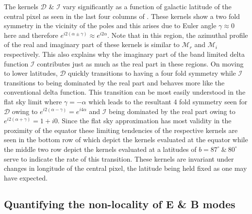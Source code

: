 The kernels $\mathcal{D}$ \& $\mathcal{I}$ vary significantly as a function of galactic latitude of the central pixel as seen in the last four columns of . These kernels show a two fold symmetry in the vicinity of the poles and this arises due to Euler angle $\gamma \approx 0$ here and therefore $e^{i2(\alpha \pm \gamma)} \approx e^{i2\alpha}$. Note that in this region, the azimuthal profile of the real and imaginary part of these kernels  is similar to $\mathcal{M}_r$ and $\mathcal{M}_i$ respectively.  This also explains why the imaginary part of the band limited delta function $\mathcal{I}$ contributes just as much as the real part in these regions. On moving to lower latitudes, $\mathcal{D}$ quickly transitions to having a four fold symmetry while $\mathcal{I}$ transitions to being dominated by the real part and behaves more like the conventional delta function. This transition can be most easily understood in the flat sky limit where $\gamma = -\alpha$ which leads to the resultant 4 fold symmetry seen for $\mathcal{D}$ owing to $e^{i2(\alpha - \gamma)} =e^{i4\alpha}$ and $\mathcal{I}$ being dominated by the real part owing to $e^{i2(\alpha + \gamma)} =1 + i0$. Since the flat sky approximation has most validity in the proximity of the equator these limiting tendencies of the respective kernels are seen in the bottom row of  which depict the kernels evaluated at the equator while the middle two row depict the kernels evaluated at a latitudes of $b=87^{\circ}~\&~ 80^{\circ}$ serve to indicate the rate of this transition. These kernels are invariant under changes in longitude of the central pixel, the latitude being held fixed as one may have expected.

\subsection{Quantifying the non-locality of E \& B modes} \label{sec:radial_locality}

